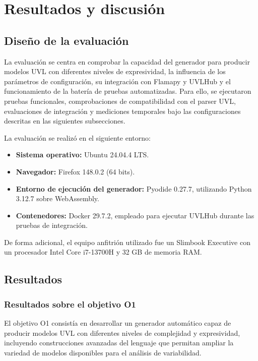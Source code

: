 \chapter{Resultados y discusión}
\label{chap:resultados}


\section{Diseño de la evaluación}
\label{sec:diseno_evaluacion}

La evaluación se centra en comprobar la capacidad del generador para producir
modelos UVL con diferentes niveles de expresividad, la influencia de los
parámetros de configuración, su integración con Flamapy y UVLHub y el
funcionamiento de la batería de pruebas automatizadas. Para ello, se ejecutaron
pruebas funcionales, comprobaciones de compatibilidad con el parser UVL,
evaluaciones de integración y mediciones temporales bajo las configuraciones
descritas en las siguientes subsecciones.

La evaluación se realizó en el siguiente entorno:

\begin{itemize}
    \item \textbf{Sistema operativo:} Ubuntu 24.04.4 LTS.
    \item \textbf{Navegador:} Firefox 148.0.2 (64 bits).
    \item \textbf{Entorno de ejecución del generador:} Pyodide 0.27.7,
    utilizando Python 3.12.7 sobre WebAssembly.
    \item \textbf{Contenedores:} Docker 29.7.2, empleado para ejecutar
    UVLHub durante las pruebas de integración.
\end{itemize}

De forma adicional, el equipo anfitrión utilizado fue un Slimbook Executive con un procesador
Intel Core i7-13700H y 32 GB de memoria RAM.

\section{Resultados}
\label{sec:resultados_objetivos}


\subsection{Resultados sobre el objetivo O1}
\label{subsec:resultados_o1}


El objetivo O1 consistía en desarrollar un generador automático capaz de
producir modelos UVL con diferentes niveles de complejidad y expresividad,
incluyendo construcciones avanzadas del lenguaje que permitan ampliar la
variedad de modelos disponibles para el análisis de variabilidad.

